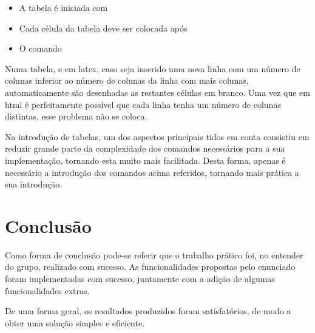 \documentclass[11pt,a4paper]{article}
\begin{document}
\begin{itemize}
    \item A tabela é iniciada com \verb@ %%table% @ e finalizada com \verb@ %table%% @;
    \item Cada célula da tabela deve ser colocada após \verb@ %head @ ou \verb@ %row @. A única diferença entre estes, consiste no formato do texto. Enquanto que o comando \verb@ %head @ coloca o texto centrado e a negrito, o comando \verb@ %row @ coloca o texto num formato normal.
    \item O comando \verb@ % @ permite a separação das células da tabela, correspondendo, no entanto, ao número total de colunas.
\end{itemize}


Numa tabela, e em latex, caso seja inserido uma nova linha com um número de colunas inferior ao número de colunas da linha com mais colunas, automaticamente são desenhadas as restantes células em branco. Uma vez que em html é perfeitamente possível que cada linha tenha um número de colunas distintas, esse problema não se coloca.

Na introdução de tabelas, um dos aspectos principais tidos em conta consistiu em reduzir grande parte da complexidade dos comandos necessários para a sua implementação, tornando esta muito mais facilitada. Desta forma, apenas é necessário a introdução dos comandos acima referidos, tornando mais prática a sua introdução. \\  

 \newpage 

\section{Conclusão}
Como forma de conclusão pode-se referir que o trabalho prático foi, no entender do grupo, realizado com sucesso. As funcionalidades propostas pelo enunciado foram implementadas com sucesso, juntamente com a adição de algumas funcionalidades extras. 

De uma forma geral, os resultados produzidos foram satisfatórios, de modo a obter uma solução simples e eficiente. 
\end{document}
